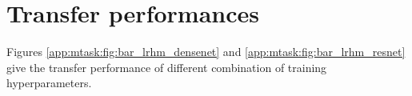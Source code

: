 
\section{Transfer performances}
\label{app:mtask:sec:transfer_perf}

Figures \ref{app:mtask:fig:bar_lrhm_densenet} and \ref{app:mtask:fig:bar_lrhm_resnet} give the transfer performance of different combination of training hyperparameters.









